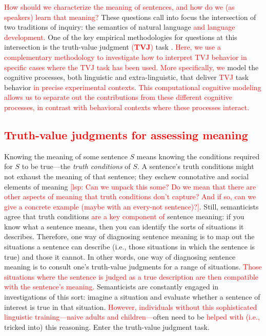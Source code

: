\documentclass[preprint,authoryear]{elsarticle}\frenchspacing
\newcommand{\gcs}[1]{\ifcomments{\textcolor{blue}{[gcs: #1]}}\fi}
\newcommand{\lsp}[1]{\textcolor{red}{[lsp: #1]}}
\newcommand{\lp}[1]{\textcolor{red}{#1}} %
\begin{document}
\lp{How should we characterize the meaning of sentences, and how do we (as speakers) learn that meaning?}
These questions call into focus the intersection of two traditions of inquiry: 
the semantics of natural language
\lp{and language development.}
One of the key empirical methodologies for questions at this intersection is the truth-value judgment 
\lp{(\textbf{TVJ})}
task \citep{crainmckee1985,crainthornton1998}. 
\lp{Here, we}
\lp{use a complementary methodology to investigate}
\lp{how to interpret TVJ behavior in specific cases where the TVJ task has been used.}
\lp{More specifically, we}
model the cognitive processes, both linguistic and extra-linguistic, that deliver \lp{TVJ} task behavior \lp{in precise experimental contexts}.
\lp{This computational cognitive modeling allows us to separate out the contributions from these different cognitive processes,
in contrast with 
behavioral contexts where these processes interact.}

\subsection{\lp{Truth-value judgments for assessing meaning}}
Knowing the meaning of some sentence $S$ means knowing the conditions required for $S$ to be true---the \emph{truth conditions} of $S$. A sentence's truth conditions might not exhaust the meaning of that sentence; they eschew connotative and social elements of meaning \lsp{Can we unpack this some? Do we mean that there are other aspects of meaning that truth conditions don't capture? And if so, can we give a concrete example (maybe with an every-not sentence)?}\gcs{I wonder if there are go-to citations for social meaning (i.e., from sociolinguistics)}. Still, semanticists agree that truth conditions %
\lp{are a key component of}
sentence meaning: if you know what a sentence means, then you can identify the sorts of situations it describes. Therefore, one way of diagnosing sentence meaning is to map out the situations a sentence can describe (i.e., those situations in which the sentence is true) and those it cannot. In other words, one way of diagnosing sentence meaning is to consult one's truth-value judgments for a range of situations. 
\lp{Those situations where the sentence is judged as a true description are then compatible with the sentence's meaning.}
Semanticists are constantly engaged in investigations of this sort: imagine a situation and evaluate whether a sentence of interest is true in that situation. 
\lp{However, individuals without this sophisticated linguistic training---naive adults and children---}often need to be 
\lp{helped with (i.e.,} tricked into)
this reasoning. 
Enter the truth-value judgment task.
\end{document}
